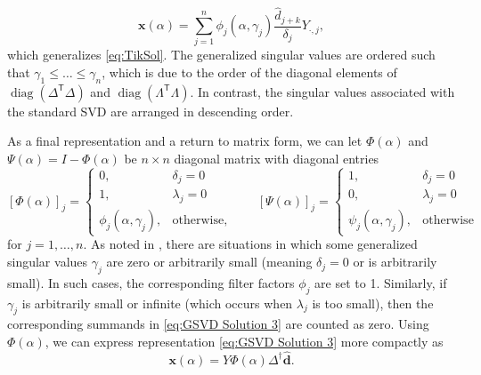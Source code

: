 \documentclass[12pt]{article}
\newcommand{\dVec}{\mathbf{d}}	%
\newcommand{\xVec}{\mathbf{x}}	%
\newcommand{\trans}[1]{{#1}^\mathsf{T}}	%
\newcommand{\pinv}[1]{{#1}^\dagger}	%
\DeclareMathOperator{\diag}{diag}	%
\newcommand{\regparam}{\alpha}  %
\newcommand{\filt}{\phi}
\newcommand{\mfilt}{\psi}
\newcommand{\svd}[1]{\widehat{#1}}	%
\begin{document}
\begin{equation}
\label{eq:GSVD Solution 3}
\xVec(\regparam) = \sum_{j = 1}^{n} \filt_j\left(\regparam,\gamma_j\right) \frac{\svd{d}_{j+k}}{\delta_j} Y_{\cdot,j},
\end{equation}
which generalizes \eqref{eq:TikSol}. The generalized singular values are ordered such that $\gamma_1 \leq \ldots \leq \gamma_n$, which is due to the order of the diagonal elements of $\diag(\trans{\Delta}\Delta)$ and $\diag(\trans{\Lambda}\Lambda)$. In contrast, the singular values associated with the standard SVD are arranged in descending order. \par
As a final representation and a return to matrix form, we can let $\Phi(\regparam)$ and $\Psi(\regparam) = I - \Phi(\regparam)$ be $n \times n$ diagonal matrix with diagonal entries
\[\left[\Phi(\regparam)\right]_j = \begin{cases}
0, & \delta_j = 0 \\
1, & \lambda_j = 0 \\
\filt_j(\regparam,\gamma_j), & \text{otherwise,}
\end{cases} \qquad
[\Psi(\regparam)]_j = \begin{cases}
1, & \delta_j = 0 \\
0, & \lambda_j = 0 \\
\mfilt_j(\regparam,\gamma_j), & \text{otherwise}
\end{cases}\]
for $j = 1,\ldots,n$. As noted in \cite[p.~107]{ABT}, there are situations in which some generalized singular values $\gamma_j$ are zero or arbitrarily small (meaning $\delta_j = 0$ or is arbitrarily small). In such cases, the corresponding filter factors $\filt_j$ are set to 1. Similarly, if $\gamma_j$ is arbitrarily small or infinite (which occurs when $\lambda_j$ is too small), then the corresponding summands in \eqref{eq:GSVD Solution 3} are counted as zero. Using $\Phi(\regparam)$, we can express representation \eqref{eq:GSVD Solution 3} more compactly as
\[\xVec(\regparam) = Y\Phi(\regparam)\pinv{\Delta}\svd{\dVec}.\]
\end{document}
